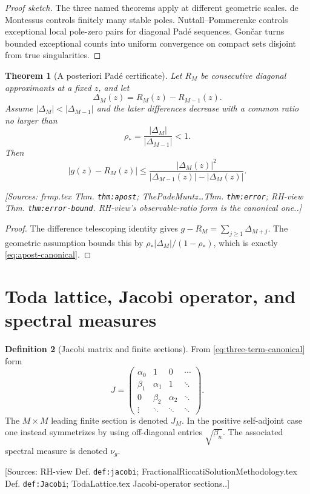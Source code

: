 \documentclass[11pt]{article}
\newtheorem{theorem}{Theorem}[section]
\theoremstyle{definition}
\newtheorem{definition}[theorem]{Definition}
\newcommand{\Source}[1]{\par\smallskip\noindent\textup{[Sources: #1.]}}
\begin{document}
\begin{proof}[Proof sketch]
The three named theorems apply at different geometric scales.
de Montessus controls finitely many stable poles.
Nuttall--Pommerenke controls exceptional local pole-zero pairs for diagonal Padé sequences.
Gončar turns bounded exceptional counts into uniform convergence on compact sets disjoint from true singularities.
\end{proof}

\begin{theorem}[A posteriori Padé certificate]\label{thm:apost}
Let $R_M$ be consecutive diagonal approximants at a fixed $z$,
and let
\begin{equation}\label{eq:deltaM}
        \Delta_M(z)=R_M(z)-R_{M-1}(z).
\end{equation}
Assume $|\Delta_M|<|\Delta_{M-1}|$ and the later differences decrease with a common ratio no larger than
\begin{equation}\label{eq:rho-star}
        \rho_* =\frac{|\Delta_M|}{|\Delta_{M-1}|}<1.
\end{equation}
Then
\begin{equation}\label{eq:apost-canonical}
        |g(z)-R_M(z)|
        \le
        \frac{|\Delta_M(z)|^2}{|\Delta_{M-1}(z)|-|\Delta_M(z)|}.
\end{equation}
\Source{frmp.tex Thm. \texttt{thm:apost}; ThePadeMuntz\ldots Thm. \texttt{thm:error}; RH-view Thm. \texttt{thm:error-bound}. RH-view's observable-ratio form is the canonical one.}
\end{theorem}

\begin{proof}
The difference telescoping identity gives
$g-R_M=\sum_{j\ge1}\Delta_{M+j}$.
The geometric assumption bounds this by
$\rho_*|\Delta_M|/(1-\rho_*)$,
which is exactly \eqref{eq:apost-canonical}.
\end{proof}

\section{Toda lattice, Jacobi operator, and spectral measures}

\begin{definition}[Jacobi matrix and finite sections]\label{def:jacobi}
From \eqref{eq:three-term-canonical} form
\begin{equation}\label{eq:jacobi}
        J=\begin{pmatrix}
        \alpha_0&1&0&\cdots\\
        \beta_1&\alpha_1&1&\ddots\\
        0&\beta_2&\alpha_2&\ddots\\
        \vdots&\ddots&\ddots&\ddots
        \end{pmatrix}.
\end{equation}
The $M\times M$ leading finite section is denoted $J_M$.
In the positive self-adjoint case one instead symmetrizes by using off-diagonal entries $\sqrt{\beta_n}$.
The associated spectral measure is denoted $\nu_g$.
\Source{RH-view Def. \texttt{def:jacobi}; FractionalRiccatiSolutionMethodology.tex Def. \texttt{def:Jacobi}; TodaLattice.tex Jacobi-operator sections.}
\end{definition}
\end{document}
